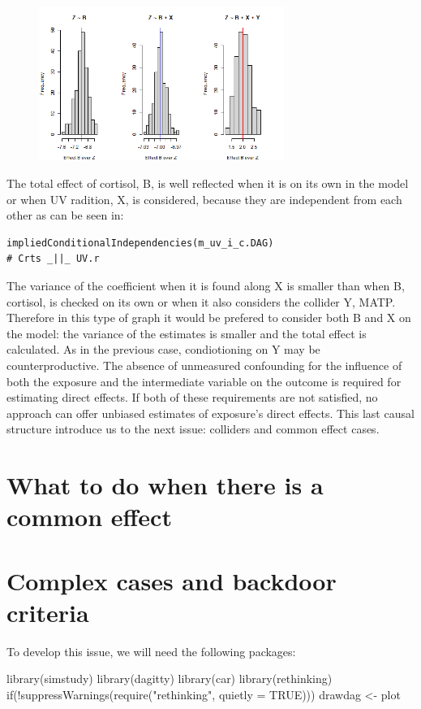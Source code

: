 \documentclass{article}
\begin{document}
\begin{figure}[h]
\includegraphics[width=8cm]{histextraoverY.png}
\centering
\end{figure}
The total effect of cortisol, B, is well reflected when it is on its own in the model or when UV radition, X, is considered, because they are independent from each other as can be seen in:
\begin{lstlisting}
impliedConditionalIndependencies(m_uv_i_c.DAG)
# Crts _||_ UV.r
\end{lstlisting}
The variance of the coefficient when it is found along X is smaller than when B, cortisol, is checked on its own or when it also considers the collider Y, MATP.
Therefore in this type of graph it would be prefered to consider both B and X on the model: the variance of the estimates is smaller and the total effect is calculated. As in the previous case, condiotioning on Y may be counterproductive. 
The absence of unmeasured confounding for the influence of both the exposure and the intermediate variable on the outcome is required for estimating direct effects. If both of these requirements are not satisfied, no approach can offer unbiased estimates of exposure's direct effects.
This last causal structure introduce us to the next issue: colliders and common effect cases.
\newpage
\section{What to do when there is a common effect}

\section{Complex cases and backdoor criteria}

To develop this issue, we will need the following packages:

\begin{lstlistings}
library(simstudy)
library(dagitty)
library(car)
library(rethinking)
if(!suppressWarnings(require("rethinking", quietly = TRUE))) {drawdag <- plot}
\end{lstlistings}
\end{document}
